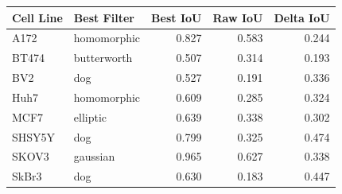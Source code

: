 \begin{tabular}{llrrr}
\toprule
Cell Line & Best Filter & Best IoU & Raw IoU & Delta IoU \\
\midrule
A172 & homomorphic & 0.827 & 0.583 & 0.244 \\
BT474 & butterworth & 0.507 & 0.314 & 0.193 \\
BV2 & dog & 0.527 & 0.191 & 0.336 \\
Huh7 & homomorphic & 0.609 & 0.285 & 0.324 \\
MCF7 & elliptic & 0.639 & 0.338 & 0.302 \\
SHSY5Y & dog & 0.799 & 0.325 & 0.474 \\
SKOV3 & gaussian & 0.965 & 0.627 & 0.338 \\
SkBr3 & dog & 0.630 & 0.183 & 0.447 \\
\bottomrule
\end{tabular}
